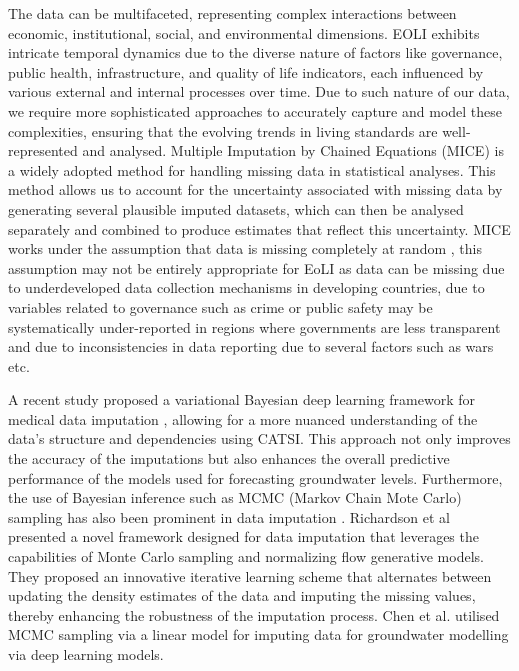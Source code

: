 The data can be multifaceted, representing complex interactions between economic, institutional, social, and environmental dimensions. EOLI exhibits intricate temporal dynamics due to the diverse nature of factors like governance, public health, infrastructure, and quality of life indicators, each influenced by various external and internal processes over time. Due to such nature of our data, we require more sophisticated approaches to accurately capture and model these complexities, ensuring that the evolving trends in living standards are well-represented and analysed. Multiple Imputation by Chained Equations (MICE) is a widely adopted method for handling missing data in statistical analyses\cite{MICE_imputation}. This method allows us to account for the uncertainty associated with missing data by generating several plausible imputed datasets, which can then be analysed separately and combined to produce estimates that reflect this uncertainty.  MICE works under the assumption that data is missing completely at random \cite{little1988test}, this assumption may not be entirely appropriate for EoLI as data can be missing due to underdeveloped data collection mechanisms in developing countries, due to variables related to governance such as crime or public safety may be systematically under-reported in regions where governments are less transparent and due to inconsistencies in data reporting due to several factors such as wars etc.    


 
A recent study proposed a variational Bayesian deep learning framework for medical data imputation \cite{kulkarniChandra2024bayes}, allowing for a more nuanced understanding of the data's structure and dependencies using CATSI. This approach not only improves the accuracy of the imputations but also enhances the overall predictive performance of the models used for forecasting groundwater levels. Furthermore, the use of Bayesian inference such as MCMC (Markov Chain Mote Carlo) sampling has also been prominent in data imputation \cite{takahashi2017statistical}. Richardson et al \cite{richardson2020mcflow}  presented a novel framework designed for data imputation that leverages the capabilities of Monte Carlo sampling and normalizing flow generative models. They proposed an innovative iterative learning scheme that alternates between updating the density estimates of the data and imputing the missing values, thereby enhancing the robustness of the imputation process. Chen et al.  \cite{chen2024deep}  utilised MCMC sampling via a linear model for imputing data for groundwater modelling via deep learning models. 


